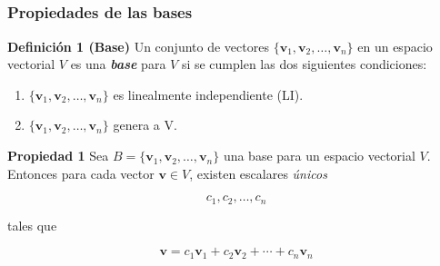 \subsection{}

{\nologo
\begin{frame}\frametitle{Propiedades de las bases}

\begin{block}{\textbf{Definición 1 (Base)}}
	\justifying
	Un conjunto de vectores $\{\mathbf{v}_1, \mathbf{v}_2, \hdots , \mathbf{v}_n \}$ en un espacio vectorial $V$ es 
	una \textbf{\textit{base}} para $V$ si se cumplen las dos siguientes condiciones:
	\begin{enumerate}
		\item[\labelname{$a$}] $\{\mathbf{v}_1, \mathbf{v}_2, \hdots , \mathbf{v}_n \}$ es linealmente independiente (LI).
		\item[\labelname{$b$}] $\{\mathbf{v}_1, \mathbf{v}_2, \hdots , \mathbf{v}_n \}$ genera a V.
	\end{enumerate}
\end{block}


\begin{prop}{\textbf{Propiedad 1}}
Sea $B=\{\mathbf{v}_1, \mathbf{v}_2, \hdots , \mathbf{v}_n \}$ una base para un espacio vectorial $V$. Entonces
para cada vector $\mathbf{v}\in V$, existen escalares \textit{únicos}

\vspace{-2mm}
\[
c_1, c_2,\hdots, c_n
\]

\vspace{-2mm}
tales que

\vspace{-2mm}
\[
	\mathbf{v} = c_1 \mathbf{v}_1 + c_2\mathbf{v}_2 + \cdots + c_n\mathbf{v}_n
\]
\end{prop}	

\end{frame}
}


\subsection{}

